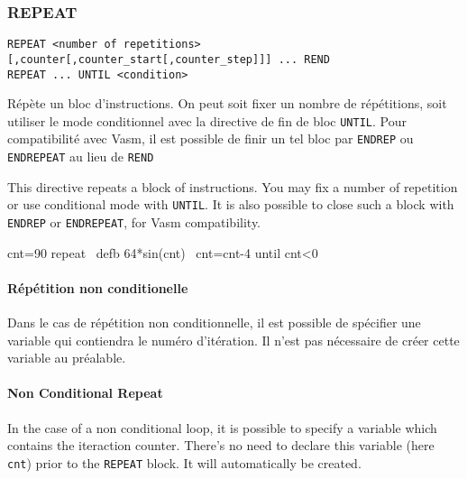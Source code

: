 \subsubsection{REPEAT}

\begin{verbatim}
REPEAT <number of repetitions>[,counter[,counter_start[,counter_step]]] ... REND
REPEAT ... UNTIL <condition>
\end{verbatim}

\begin{xfr}
Répète un bloc d'instructions.
On peut soit fixer un nombre de répétitions, soit utiliser le mode conditionnel avec la directive de fin de bloc \texttt{UNTIL}. Pour compatibilité avec Vasm, il est possible de finir un tel bloc par \texttt{ENDREP} ou \texttt{ENDREPEAT} au lieu de \texttt{REND}
\end{xfr}

\begin{xen}
This directive repeats a block of instructions. You may fix a number of repetition or use conditional mode with \texttt{UNTIL}. It is also possible to close such a block with \texttt{ENDREP} or \texttt{ENDREPEAT}, for Vasm compatibility.
\end{xen}

\begin{code}
cnt=90
repeat
\    defb 64*sin(cnt)
\    cnt=cnt-4
until cnt\textless 0
\end{code}


\begin{xfr}
\paragraph{Répétition non conditionelle}
Dans le cas de répétition non conditionnelle, il est possible de spécifier une variable qui contiendra le numéro d'itération.
Il n'est pas nécessaire de créer cette variable au préalable.
\end{xfr}

\begin{xen}
\paragraph{Non Conditional Repeat}
In the case of a non conditional loop, it is possible to specify a variable which contains the iteraction counter.
There's no need to declare this variable (here \texttt{cnt}) prior to the \texttt{REPEAT} block. It will automatically be created.
\end{xen}


